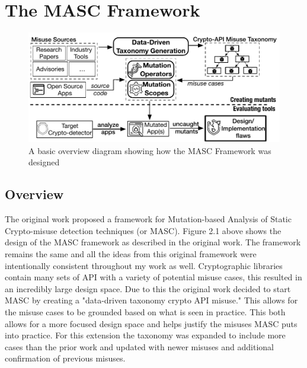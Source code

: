 \chapter{The MASC Framework}
\label{chap_framework}
\begin{figure}[!ht]
	\centering
    \includegraphics[width=0.96\linewidth]{figures/overview.pdf}
	\vspace{-1.em}
    \caption{\small A basic overview diagram showing how the MASC Framework was designed}
    \label{fig:overview}
	
\end{figure}
\section{Overview}
\label{ch2:sec:overview}

The original work proposed a framework for Mutation-based Analysis of Static Crypto-misuse detection techniques (or MASC). Figure 2.1 above shows the design of the MASC framework as described in the original work. The framework remains the same and all the ideas from this original framework were intentionally consistent throughout my work as well. Cryptographic libraries contain many sets of API with a variety of potential misuse cases, this resulted in an incredibly large design space. Due to this the original work decided to start MASC by creating a "data-driven taxonomy crypto API misuse." This allows for the misuse cases to be grounded based on what is seen in practice. This both allows for a more focused design space and helps justify the misuses MASC puts into practice. For this extension the taxonomy was expanded to include more cases than the prior work and updated with newer misuses and additional confirmation of previous misuses.

